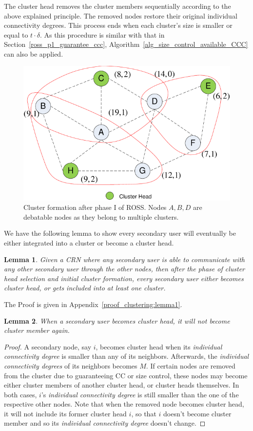 \documentclass[times]{ettauth}
\theoremstyle{mytheoremstyle}
\theoremstyle{mytheoremstyle}
\theoremstyle{mytheoremstyle}
\newtheorem{lemma}{Lemma}[section]
\begin{document}
The cluster head removes the cluster members sequentially according to the above explained principle.
The removed nodes restore their original individual connectivity degrees.
This process ends when each cluster's size is smaller or equal to $t \cdot\delta$.
As this procedure is similar with that in Section~\ref{ross_p1_guarantee_ccc}, Algorithm~\ref{alg_size_control_available_CCC} can also be applied.

\begin{figure}[ht!]
  \centering
  \includegraphics[width=0.5\linewidth]{figure2.pdf}
  \caption{Cluster formation after phase I of ROSS. Nodes $A, B, D$ are debatable nodes as they belong to multiple clusters.}
  \label{fig2}
\end{figure}


We have the following lemma to show every secondary user will eventually be either integrated into a cluster or become a cluster head.

\begin{lemma}
\label{clustering:lemma1}
Given a CRN where any secondary user is able to communicate with any other secondary user through the other nodes, then after the phase of cluster head selection and initial cluster formation, every secondary user either becomes cluster head, or gets included into at least one cluster.
\end{lemma}
The Proof is given in Appendix~\ref{proof_clustering:lemma1}.

\begin{lemma}
\label{clustering:lemma2}
When a secondary user becomes cluster head, it will not become cluster member again.
\end{lemma}
\begin{proof}
A secondary node, say $i$, becomes cluster head when its \textit{individual connectivity degree} is smaller than any of its neighbors.
Afterwards, the \textit{individual connectivity degrees} of its neighbors becomes $M$.
If certain nodes are removed from the cluster due to guaranteeing CC or size control, these nodes may become either cluster members of another cluster head, or cluster heads themselves.
In both cases, $i$'s \textit{individual connectivity degree} is still smaller than the one of the respective other nodes.
Note that when the removed node becomes cluster head, it will not include its former cluster head $i$, so that $i$ doesn't become cluster member and so its \textit{individual connectivity degree} doesn't change.
\end{proof}
\end{document}
